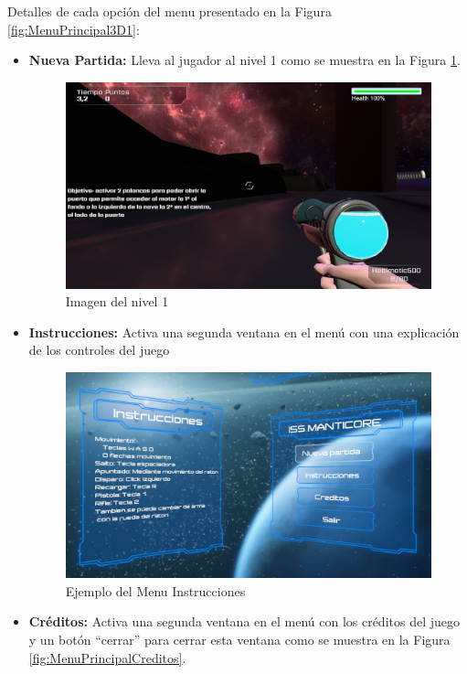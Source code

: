 Detalles de cada opción del menu presentado en la Figura \ref{fig:MenuPrincipal3D1}:
\begin{itemize}
	\item \textbf{Nueva Partida:} Lleva al jugador al nivel 1 como se muestra en la Figura \ref{fig:Nivel13D}.
	\begin{figure}[H]
		\centering
		\includegraphics[scale=0.40]{imagenes/Nivel13D.png}
		\caption{\label{fig:Nivel13D}Imagen del nivel 1}
	\end{figure}
	\item \textbf{Instrucciones:} Activa una segunda ventana en el menú con una explicación de los controles del juego
	\begin{figure}[H]
		\centering
		\includegraphics[scale=0.35]{imagenes/MenuPrincipalInstrucciones.png}
		\caption{\label{fig:MenuPrincipalInstrucciones}Ejemplo del Menu Instrucciones}
	\end{figure}
	\item \textbf{Créditos:} Activa una segunda ventana en el menú con los créditos del juego y un botón ``cerrar'' para cerrar esta ventana como se muestra en la Figura \ref{fig:MenuPrincipalCreditos}.

\end{itemize}
